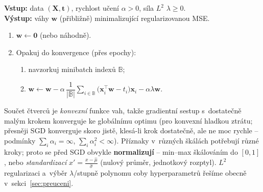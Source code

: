 \begin{algo}
\textbf{Vstup:} data $(\mathbf{X},\mathbf{t})$, rychlost učení $\alpha>0$, síla $L^2$ $\lambda\ge0$.\\
\textbf{Výstup:} váhy $\mathbf{w}$ (přibližně) minimalizující regularizovanou MSE.
\begin{enumerate}
  \item $\mathbf{w}\leftarrow\mathbf{0}$ (nebo náhodně). 
  \item Opakuj do konvergence (přes epochy):
  \begin{enumerate}
    \item navzorkuj minibatch indexů $\mathbb{B}$; 
    \item $\mathbf{w}\leftarrow\mathbf{w}-\alpha\,\dfrac{1}{|\mathbb{B}|}\displaystyle\sum_{i\in\mathbb{B}}\big(\mathbf{x}_i^{\!\top}\mathbf{w}-t_i\big)\mathbf{x}_i-\alpha\lambda\mathbf{w}.$ 
  \end{enumerate}
\end{enumerate}
\end{algo}

\begin{poznamka}
Součet čtverců je \emph{konvexní} funkce vah, takže gradientní sestup s~dostatečně malým krokem konverguje ke globálnímu optimu (pro konvexní hladkou ztrátu; přesněji SGD konverguje skoro jistě, klesá-li krok dostatečně, ale ne moc rychle -- podmínky $\sum_i\alpha_i=\infty$, $\sum_i\alpha_i^2<\infty$). Příznaky v~různých škálách potřebují různé kroky; proto se před SGD obvykle \textbf{normalizují} -- min--max škálováním do $[0,1]$, nebo \emph{standardizací} $x'=\frac{x-\hat\mu}{\hat\sigma}$ (nulový průměr, jednotkový rozptyl). $L^2$ regularizaci a~výběr $\lambda$/stupně polynomu coby hyperparametrů řešíme obecně v~sekci~\ref{sec:preuceni}.
\end{poznamka}


